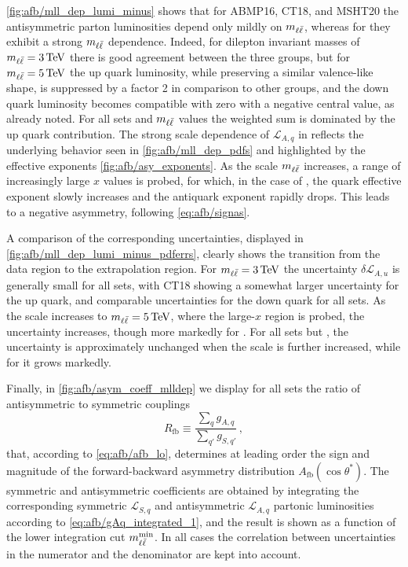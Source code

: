 \cref{fig:afb/mll_dep_lumi_minus} shows that for ABMP16, CT18, and
MSHT20 the antisymmetric
parton luminosities depend only mildly on $m_{\ell\bar{\ell}}$, whereas for 
they exhibit a strong $m_{\ell\bar{\ell}}$ dependence.
%
Indeed, for dilepton invariant masses of $\mll=\SI{3}{\tera\electronvolt}$ there is good
agreement between the three groups, but
for $\mll=\SI{5}{\tera\electronvolt}$ the  up quark luminosity, while preserving a
similar valence-like shape, is suppressed
by a factor 2 in comparison  to other groups, and the down quark luminosity becomes compatible with zero with a negative
central value,  as already noted. 
%
For all \pdf sets and  $m_{\ell\bar{\ell}}$ values the weighted sum is dominated by the up quark contribution.
The strong scale dependence of $\mathcal{L}_{A,q}$ in 
reflects the underlying \pdf behavior seen in  \cref{fig:afb/mll_dep_pdfs}
and highlighted by the effective exponents \cref{fig:afb/asy_exponents}.
%
As the scale $m_{\ell\bar{\ell}}$ increases, a range of increasingly large $x$ values is probed,
for which, in the case of
, the quark effective exponent slowly increases and the
antiquark exponent rapidly drops.
%
This leads to a negative asymmetry, 
following  \cref{eq:afb/signas}. 

A comparison of the corresponding \pdf uncertainties, displayed in
\cref{fig:afb/mll_dep_lumi_minus_pdferrs}, clearly shows the transition
from the data region to the extrapolation region.
%
For
$\mll=\SI{3}{\tera\electronvolt}$ the uncertainty $\delta \mathcal{L}_{A,u}$ is generally
small for all sets, with CT18
showing a somewhat larger uncertainty for the up quark, and comparable
uncertainties for the down quark for all \pdf sets.
%
As the scale  increases to $\mll=\SI{5}{\tera\electronvolt}$, where the large-$x$ region is
probed,  the uncertainty 
increases, though more markedly for .
%
For all \pdf sets but
, the
uncertainty is approximately unchanged when the scale is further increased,
while for  it grows markedly.

Finally, in \cref{fig:afb/asym_coeff_mlldep} we display for all
\pdf sets the
ratio of antisymmetric to symmetric couplings
\begin{equation}
\label{eq:afb/coupling_ratio}
R_{\text{fb}}\equiv \frac{\sum_q g_{A,q}}{\sum_{q'} g_{S,{q'}}} \, ,
\end{equation}
that, according to
\cref{eq:afb/afb_lo}, determines at leading order
the sign and magnitude
of the forward-backward asymmetry distribution $A_{\text{fb}}(\cos\theta^*)$.
%
The symmetric and antisymmetric coefficients are obtained by integrating
the corresponding symmetric $\mathcal{L}_{S,q}$ and antisymmetric
$\mathcal{L}_{A,q}$ partonic luminosities according to
\cref{eq:afb/gAq_integrated_1}, and the result is shown as a function of the lower integration cut $m_{\ell\bar{\ell}}^{\text{min}}$.
%
In all cases the correlation between \pdf uncertainties in the numerator and
the denominator are kept into account.

